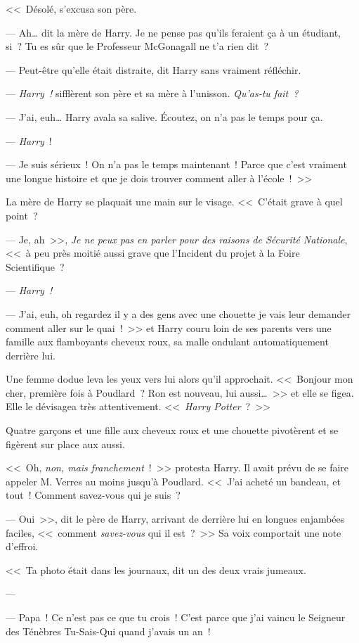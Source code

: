 <<~Désolé, s'excusa son père.

--- Ah… dit la mère de Harry. Je ne pense pas qu'ils feraient ça à un étudiant, si~? Tu es sûr que le Professeur McGonagall ne t'a rien dit~?

--- Peut-être qu'elle était distraite, dit Harry sans vraiment réfléchir.

--- \emph{Harry~!} sifflèrent son père et sa mère à l'unisson. \emph{Qu'as-tu fait~?}

--- J'ai, euh… Harry avala sa salive. Écoutez, on n'a pas le temps pour ça.

--- \emph{Harry}~!

--- Je suis sérieux~! On n'a pas le temps maintenant~! Parce que c'est vraiment une longue histoire et que je dois trouver comment aller à l'école~!~>>

La mère de Harry se plaquait une main sur le visage.
<<~C'était grave à quel point~?

--- Je, ah~>>, \emph{Je ne peux pas en parler pour des raisons de Sécurité Nationale}, <<~à peu près moitié aussi grave que l'Incident du projet à la Foire Scientifique~?

--- \emph{Harry~!}

--- J'ai, euh, oh regardez il y a des gens avec une chouette je vais leur demander comment aller sur le quai~!~>> et Harry couru loin de ses parents vers une famille aux flamboyants cheveux roux, sa malle ondulant automatiquement derrière lui.

Une femme dodue leva les yeux vers lui alors qu'il approchait. <<~Bonjour mon cher, première fois à Poudlard~? Ron est nouveau, lui aussi…~>> et elle se figea. Elle le dévisagea très attentivement. <<~\emph{Harry Potter}~?~>>

Quatre garçons et une fille aux cheveux roux et une chouette pivotèrent et se figèrent sur place aux aussi.

<<~Oh, \emph{non, mais franchement}~!~>> protesta Harry. Il avait prévu de se faire appeler M. Verres au moins jusqu'à Poudlard. <<~J'ai acheté un bandeau, et tout~! Comment savez-vous qui je suis~?

--- Oui~>>, dit le père de Harry, arrivant de derrière lui en longues enjambées faciles, <<~comment \emph{savez-vous} qui il est~?~>> Sa voix comportait une note d'effroi.

<<~Ta photo était dans les journaux, dit un des deux vrais jumeaux.

--- 

--- Papa~! Ce n'est pas ce que tu crois~! C'est parce que j'ai vaincu le Seigneur des Ténèbres Tu-Sais-Qui quand j'avais un an~!

